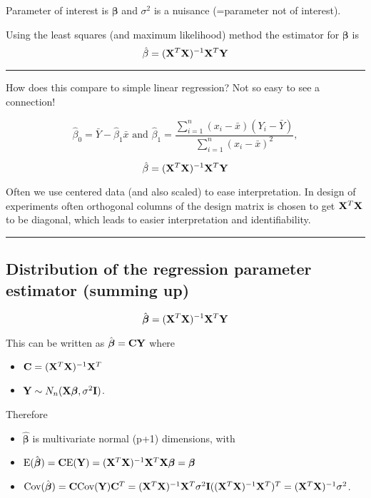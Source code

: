 \documentclass[]{article}
\providecommand{\tightlist}{%
  \setlength{\itemsep}{0pt}\setlength{\parskip}{0pt}}
\begin{document}
Parameter of interest is \(\boldsymbol{\beta}\) and \(\sigma^2\) is a
nuisance (=parameter not of interest).

Using the least squares (and maximum likelihood) method the estimator
for \(\boldsymbol\beta\) is
\[ \hat\beta=({\bf X}^T{\bf X})^{-1} {\bf X}^T {\bf Y}\]

\begin{center}\rule{0.5\linewidth}{\linethickness}\end{center}

How does this compare to simple linear regression? Not so easy to see a
connection!

\[\hat{\beta}_0 = \bar{Y}-\hat{\beta}_1 \bar{x} \text{ and } \hat{\beta}_1 = \frac{\sum_{i=1}^n(x_i-\bar{x})(Y_i-\bar{Y})}{\sum_{i=1}^n(x_i-\bar{x})^2},\]

\[ \hat\beta=({\bf X}^T{\bf X})^{-1} {\bf X}^T {\bf Y}\]

Often we use centered data (and also scaled) to ease interpretation. In
design of experiments often orthogonal columns of the design matrix is
chosen to get \({\bf X}^T{\bf X}\) to be diagonal, which leads to easier
interpretation and identifiability.

\begin{center}\rule{0.5\linewidth}{\linethickness}\end{center}

\hypertarget{distribution-of-the-regression-parameter-estimator-summing-up}{%
\subsection{Distribution of the regression parameter estimator (summing
up)}\label{distribution-of-the-regression-parameter-estimator-summing-up}}

\[ \hat{\boldsymbol\beta}=({\bf X}^T{\bf X})^{-1} {\bf X}^T {\bf Y}\]

This can be written as \(\hat{\boldsymbol\beta}={\bf C}{\bf Y}\) where

\begin{itemize}
\tightlist
\item
  \({\bf C}=({\bf X}^T{\bf X})^{-1} {\bf X}^T\)
\item
  \({\bf Y} \sim N_{n}({\bf X} {\boldsymbol\beta},\sigma^2 {\bf I})\).
\end{itemize}

Therefore

\begin{itemize}
\tightlist
\item
  \(\hat{\boldsymbol\beta}\) is multivariate normal (p+1) dimensions,
  with
\item
  \(\text{E}(\hat{\boldsymbol\beta})={\bf C}\text{E}({\bf Y})=({\bf X}^T{\bf X})^{-1} {\bf X}^T{\bf X} {\boldsymbol\beta}={\boldsymbol\beta}\)
\item
  \(\text{Cov}(\hat{\boldsymbol\beta})={\bf C}\text{Cov}({\bf Y}){\bf C}^T=({\bf X}^T{\bf X})^{-1} {\bf X}^T \sigma^2 {\bf I}(({\bf X}^T{\bf X})^{-1} {\bf X}^T)^T =({\bf X}^T{\bf X})^{-1} \sigma^2\).
\end{itemize}
\end{document}
